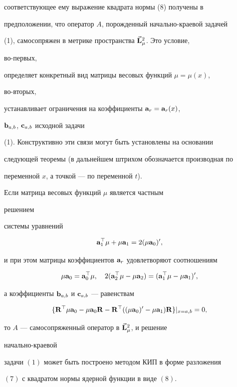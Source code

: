 соответствующее ему выражение квадрата нормы (8) получены в 


предположении, что оператор $A$, порожденный начально-краевой задачей 


(1), самосопряжен в метрике пространства $\Vec{\bold{L}}^2_\mu$. Это условие, 


во-первых, 


определяет конкретный вид матрицы весовых функций $\mu=\mu(x)$, 


во-вторых, 


устанавливает ограничения на коэффициенты $\bold a_r=\bold a_r(x)$, 


$\bold b_{a,b}$, $\bold c_{a,b}$ исходной задачи 


(1). Конструктивно эти связи могут быть установлены на основании 


следующей теоремы (в дальнейшем штрихом обозначается производная по 


переменной $x$, а точкой --- по переменной $t$). 


 


\begin{thm} Если матрица весовых функций $\mu$ является частным 


решением 


системы уравнений 


\begin{equation} 


\bold a^\top_1\mu+\mu\bold a_1=2(\mu\bold a_0)', 


\end{equation} 


и при этом матрицы коэффициентов $\bold a_r$ удовлетворяют соотношениям 


\begin{equation} 


\mu\bold a_0=\bold a^\top_0\mu,\quad 


2(\bold a^\top_2\mu-\mu\bold a_2)= 


(\bold a^\top_1\mu-\mu\bold a_1)', 


\end{equation} 


а коэффициенты $\bold b_{a,b}$ и $\bold c_{a,b}$ --- равенствам 


\begin{equation} 


\{\bold R^\top\mu\bold a_0-\mu\bold a_0\bold R- 


\bold R^\top((\mu\bold a_0)'-\mu\bold a_1) 


\bold R\}|_{x=a,b}=0, 


\end{equation} 


то $A$ --- самосопряженный оператор в $\Vec{\bold{L}}^2_\mu$, и решение 


начально-краевой 


задачи $(1)$ может быть построено методом КИП в форме разложения 


$(7)$ с квадратом нормы ядерной функции в виде $(8)$. 


\end{thm} 


